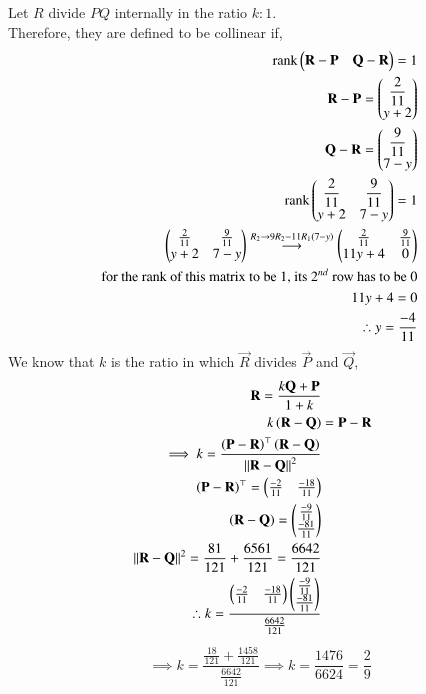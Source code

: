 \documentclass[journal,12pt,onecolumn]{IEEEtran}
\theoremstyle{remark}
\begin{document}
Let $R$ divide $PQ$ internally in the ratio $k:1$.\\
Therefore, they are defined to be collinear if,
\begin{align*}
    \text{rank}\begin{pmatrix}\mathbf{R}- \mathbf{P} & \mathbf{Q}-\mathbf{R}\end{pmatrix}=1\\
    \mathbf{R}-\mathbf{P}=\begin{pmatrix}\dfrac{2}{11} \\ y+2\end{pmatrix}\\
    \mathbf{Q}-\mathbf{R}=\begin{pmatrix}\dfrac{9}{11} \\ 7-y\end{pmatrix}\\
    \text{rank}\begin{pmatrix}\dfrac{2}{11} & \dfrac{9}{11} \\ y+2 & 7-y\end{pmatrix} = 1\\
    \begin{pmatrix}\frac{2}{11}&\frac{9}{11}\\ y+2&7-y\end{pmatrix} \overset{R_2 \rightarrow 9R_2-11 R_1\left(7-y\right)}{\longrightarrow} \begin{pmatrix}\frac{2}{11} &\frac{9}{11} \\ 11y+4 & 0\end{pmatrix} \\
    \text{for the rank of this matrix to be 1, its $2^{nd}$ row has to be 0}\\ 11y+{4}=0\\
    \therefore y=\dfrac{-4}{11}
\end{align*}
We know that $k$ is the ratio in which $\vec{R}$ divides $\vec{P}$ and $\vec{Q}$,
\begin{align*}
   \mathbf{R}=\dfrac{k\mathbf{Q}+\mathbf{P}}{1+k}\\
   k\left(\mathbf{R}-\mathbf{Q}\right)&= \mathbf{P}-\mathbf{R}\\
   \implies k =\dfrac{\left(\mathbf{P}-\mathbf{R}\right)^{\top}\left(\mathbf{R}-\mathbf{Q}\right)}{\left\lVert\mathbf{R}-\mathbf{Q}\right\rVert^2}\\
   \left(\mathbf{P}-\mathbf{R}\right)^{\top}=\begin{pmatrix}\frac{-2}{11} & \frac{-18}{11}\end{pmatrix}\\
   \left(\mathbf{R}-\mathbf{Q}\right)=\begin{pmatrix}\frac{-9}{11} \\ \frac{-81}{11}\end{pmatrix}\\
   \left\lVert\mathbf{R}-\mathbf{Q}\right\rVert^2=\frac{81}{121} + \frac{6561}{121}=\frac{6642}{121}\\
   \therefore k=\dfrac{\begin{pmatrix}\frac{-2}{11} & \frac{-18}{11}\end{pmatrix}\begin{pmatrix}\frac{-9}{11} \\ \frac{-81}{11}\end{pmatrix}}{\frac{6642}{121}}\\
   \end{align*}
\begin{align*}
   \implies k=\dfrac{\frac{18}{121} + \frac{1458}{121}}{\frac{6642}{121}}
   \implies k=\dfrac{1476}{6624}=\dfrac{2}{9}
\end{align*}
\end{document}
